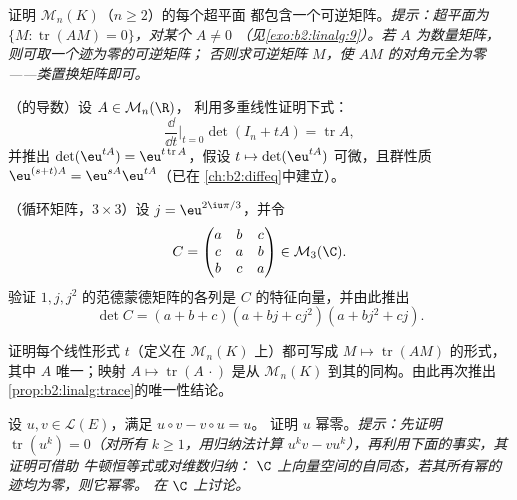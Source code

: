 \begin{exercise}[$\star\star$]\label{exo:b2:linalg:6}
证明 $\mathcal{M}_n(K)$（$n \geq 2$）的每个超平面
都包含一个可逆矩阵。\emph{提示：超平面为 $\{M :
\operatorname{tr}(AM) = 0\}$，对某个 $A \neq 0$
（见\cref{exo:b2:linalg:9}）。若 $A$ 为数量矩阵，则可取一个迹为零的可逆矩阵；
否则求可逆矩阵 $M$，使
$AM$ 的对角元全为零——类置换矩阵即可。}
\end{exercise}

\begin{exercise}[$\star\star$]\label{exo:b2:linalg:7}
（的导数）设 $A \in \mathcal{M}_n(\R)$，
利用多重线性证明下式：
\[
\frac{\dd}{\dd t}\Big|_{t=0} \det(I_n + tA) = \operatorname{tr} A ,
\]
并推出 $\det(\eu^{tA}) = \eu^{t\operatorname{tr} A}$，假设
$t \mapsto \det(\eu^{tA})$ 可微，且群性质
$\eu^{(s+t)A} = \eu^{sA}\eu^{tA}$（已在
\cref{ch:b2:diffeq}中建立）。
\end{exercise}

\begin{exercise}[$\star\star$]\label{exo:b2:linalg:8}
（循环矩阵，$3 \times 3$）设 $j = \eu^{2\iu\pi/3}$，并令
\[
C = \begin{pmatrix}
a & b & c\\
c & a & b\\
b & c & a
\end{pmatrix} \in \mathcal{M}_3(\C).
\]
验证 $1, j, j^2$ 的范德蒙德矩阵的各列是
$C$ 的特征向量，并由此推出
\[
\det C = (a + b + c)(a + bj + cj^2)(a + bj^2 + cj).
\]
\end{exercise}

\begin{exercise}[$\star\star\star$]\label{exo:b2:linalg:9}
证明每个线性形式 $t$（定义在 $\mathcal{M}_n(K)$ 上）都可写成 $M \mapsto
\operatorname{tr}(AM)$ 的形式，其中 $A$ 唯一；映射 $A \mapsto
\operatorname{tr}(A\,\cdot)$ 是从
$\mathcal{M}_n(K)$ 到其的同构。由此再次推出
\cref{prop:b2:linalg:trace}的唯一性结论。
\end{exercise}

\begin{exercise}[$\star\star\star$]\label{exo:b2:linalg:10}
设 $u, v \in \mathcal{L}(E)$，满足 $u \circ v - v \circ u = u$。
证明 $u$ 幂零。\emph{提示：先证明
$\operatorname{tr}(u^k) = 0$（对所有 $k \geq 1$，用归纳法计算 $u^k v -
v u^k$），再利用下面的事实，其证明可借助
牛顿恒等式或对维数归纳：
$\C$ 上向量空间的自同态，若其所有幂的迹均为零，则它幂零。
在 $\C$ 上讨论。}
\end{exercise}

